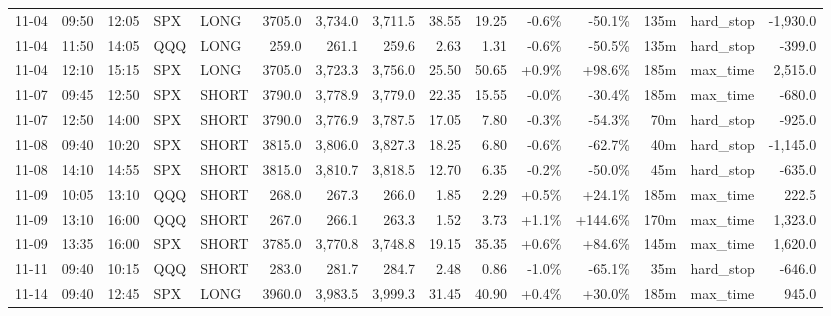 \documentclass[11pt,a4paper,twoside]{article}
\begin{document}
\begin{landscape}
\begin{center}
\begin{longtable}{>{\color{txtmain}}l l l l l r r r r r r r r >{\color{txtmain}}l r}
11-04 & 09:50 & 12:05 & SPX & LONG & 3705.0 & 3,734.0 & 3,711.5 & 38.55 & 19.25 & \textcolor{lossred}{-0.6\%} & \textcolor{lossred}{-50.1\%} & 135m & hard\_stop & \textcolor{lossred}{-1,930.0} \\
11-04 & 11:50 & 14:05 & QQQ & LONG & 259.0 & 261.1 & 259.6 & 2.63 & 1.31 & \textcolor{lossred}{-0.6\%} & \textcolor{lossred}{-50.5\%} & 135m & hard\_stop & \textcolor{lossred}{-399.0} \\
11-04 & 12:10 & 15:15 & SPX & LONG & 3705.0 & 3,723.3 & 3,756.0 & 25.50 & 50.65 & \textcolor{wingreen}{+0.9\%} & \textcolor{wingreen}{+98.6\%} & 185m & max\_time & \textcolor{wingreen}{2,515.0} \\
11-07 & 09:45 & 12:50 & SPX & SHORT & 3790.0 & 3,778.9 & 3,779.0 & 22.35 & 15.55 & \textcolor{lossred}{-0.0\%} & \textcolor{lossred}{-30.4\%} & 185m & max\_time & \textcolor{lossred}{-680.0} \\
11-07 & 12:50 & 14:00 & SPX & SHORT & 3790.0 & 3,776.9 & 3,787.5 & 17.05 & 7.80 & \textcolor{lossred}{-0.3\%} & \textcolor{lossred}{-54.3\%} & 70m & hard\_stop & \textcolor{lossred}{-925.0} \\
11-08 & 09:40 & 10:20 & SPX & SHORT & 3815.0 & 3,806.0 & 3,827.3 & 18.25 & 6.80 & \textcolor{lossred}{-0.6\%} & \textcolor{lossred}{-62.7\%} & 40m & hard\_stop & \textcolor{lossred}{-1,145.0} \\
11-08 & 14:10 & 14:55 & SPX & SHORT & 3815.0 & 3,810.7 & 3,818.5 & 12.70 & 6.35 & \textcolor{lossred}{-0.2\%} & \textcolor{lossred}{-50.0\%} & 45m & hard\_stop & \textcolor{lossred}{-635.0} \\
11-09 & 10:05 & 13:10 & QQQ & SHORT & 268.0 & 267.3 & 266.0 & 1.85 & 2.29 & \textcolor{wingreen}{+0.5\%} & \textcolor{wingreen}{+24.1\%} & 185m & max\_time & \textcolor{wingreen}{222.5} \\
11-09 & 13:10 & 16:00 & QQQ & SHORT & 267.0 & 266.1 & 263.3 & 1.52 & 3.73 & \textcolor{wingreen}{+1.1\%} & \textcolor{wingreen}{+144.6\%} & 170m & max\_time & \textcolor{wingreen}{1,323.0} \\
11-09 & 13:35 & 16:00 & SPX & SHORT & 3785.0 & 3,770.8 & 3,748.8 & 19.15 & 35.35 & \textcolor{wingreen}{+0.6\%} & \textcolor{wingreen}{+84.6\%} & 145m & max\_time & \textcolor{wingreen}{1,620.0} \\
11-11 & 09:40 & 10:15 & QQQ & SHORT & 283.0 & 281.7 & 284.7 & 2.48 & 0.86 & \textcolor{lossred}{-1.0\%} & \textcolor{lossred}{-65.1\%} & 35m & hard\_stop & \textcolor{lossred}{-646.0} \\
11-14 & 09:40 & 12:45 & SPX & LONG & 3960.0 & 3,983.5 & 3,999.3 & 31.45 & 40.90 & \textcolor{wingreen}{+0.4\%} & \textcolor{wingreen}{+30.0\%} & 185m & max\_time & \textcolor{wingreen}{945.0} \\

\end{longtable}
\end{center}
\end{landscape}
\end{document}
